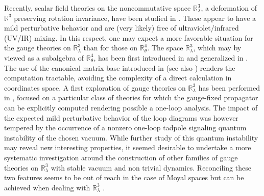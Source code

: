 \documentclass[a4paper,11pt,twoside]{article}
\numberwithin{equation}{section}
\theoremstyle{nonumberplain}
\newcounter{and}
\begin{document}
Recently, scalar field theories on the noncommutative space $\mathbb{R}^3_\lambda$, a deformation of $\mathbb{R}^3$ preserving rotation invariance, have been studied in \cite{vit-wal-12}. These appear  to have a mild perturbative behavior and are (very likely) free of ultraviolet/infrared (UV/IR) mixing. In this respect, one may expect a more favorable situation for the gauge theories on $\mathbb{R}^3_\lambda$ than for those on $\mathbb{R}^4_\theta$. The space $\mathbb{R}^3_\lambda$, which may by viewed as a subalgebra of $\mathbb{R}^4_\theta$,  has been first introduced in \cite{Hammaa} and generalized in \cite{selene}. The use of the canonical matrix base introduced in \cite{vit-wal-12} (see also \cite{duflo}) renders the computation tractable, avoiding the complexity of a direct calculation in coordinates space. A first exploration of gauge theories on $\mathbb{R}^3_\lambda$ has been performed in \cite{gervitwal-13}, focused on a particular class of theories for which the gauge-fixed propagator can be explicitly computed rendering possible a one-loop analysis. The impact of the expected mild perturbative behavior of the loop diagrams was however tempered by the occurrence of a nonzero one-loop tadpole signaling quantum instability of the chosen vacuum. While further study of this quantum instability may reveal new interesting properties, it seemed desirable to undertake a more systematic investigation around the construction of other families of gauge theories on $\mathbb{R}^3_\lambda$ with stable vacuum and non trivial dynamics. Reconciling these two features seems to be out of reach in the case of Moyal spaces but can be achieved when dealing with $\mathbb{R}^3_\lambda$ .\par
\end{document}

